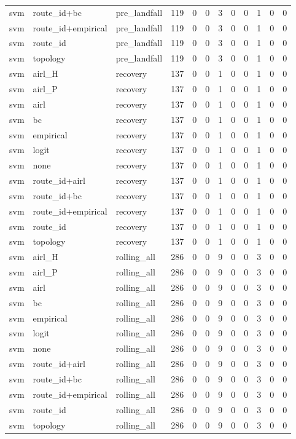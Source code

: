 \begin{tabular}{lllrrrrrrrrr}
svm & route_id+bc & pre_landfall & 119 & 0 & 0 & 3 & 0 & 0 & 1 & 0 & 0 \\
svm & route_id+empirical & pre_landfall & 119 & 0 & 0 & 3 & 0 & 0 & 1 & 0 & 0 \\
svm & route_id & pre_landfall & 119 & 0 & 0 & 3 & 0 & 0 & 1 & 0 & 0 \\
svm & topology & pre_landfall & 119 & 0 & 0 & 3 & 0 & 0 & 1 & 0 & 0 \\
svm & airl_H & recovery & 137 & 0 & 0 & 1 & 0 & 0 & 1 & 0 & 0 \\
svm & airl_P & recovery & 137 & 0 & 0 & 1 & 0 & 0 & 1 & 0 & 0 \\
svm & airl & recovery & 137 & 0 & 0 & 1 & 0 & 0 & 1 & 0 & 0 \\
svm & bc & recovery & 137 & 0 & 0 & 1 & 0 & 0 & 1 & 0 & 0 \\
svm & empirical & recovery & 137 & 0 & 0 & 1 & 0 & 0 & 1 & 0 & 0 \\
svm & logit & recovery & 137 & 0 & 0 & 1 & 0 & 0 & 1 & 0 & 0 \\
svm & none & recovery & 137 & 0 & 0 & 1 & 0 & 0 & 1 & 0 & 0 \\
svm & route_id+airl & recovery & 137 & 0 & 0 & 1 & 0 & 0 & 1 & 0 & 0 \\
svm & route_id+bc & recovery & 137 & 0 & 0 & 1 & 0 & 0 & 1 & 0 & 0 \\
svm & route_id+empirical & recovery & 137 & 0 & 0 & 1 & 0 & 0 & 1 & 0 & 0 \\
svm & route_id & recovery & 137 & 0 & 0 & 1 & 0 & 0 & 1 & 0 & 0 \\
svm & topology & recovery & 137 & 0 & 0 & 1 & 0 & 0 & 1 & 0 & 0 \\
svm & airl_H & rolling_all & 286 & 0 & 0 & 9 & 0 & 0 & 3 & 0 & 0 \\
svm & airl_P & rolling_all & 286 & 0 & 0 & 9 & 0 & 0 & 3 & 0 & 0 \\
svm & airl & rolling_all & 286 & 0 & 0 & 9 & 0 & 0 & 3 & 0 & 0 \\
svm & bc & rolling_all & 286 & 0 & 0 & 9 & 0 & 0 & 3 & 0 & 0 \\
svm & empirical & rolling_all & 286 & 0 & 0 & 9 & 0 & 0 & 3 & 0 & 0 \\
svm & logit & rolling_all & 286 & 0 & 0 & 9 & 0 & 0 & 3 & 0 & 0 \\
svm & none & rolling_all & 286 & 0 & 0 & 9 & 0 & 0 & 3 & 0 & 0 \\
svm & route_id+airl & rolling_all & 286 & 0 & 0 & 9 & 0 & 0 & 3 & 0 & 0 \\
svm & route_id+bc & rolling_all & 286 & 0 & 0 & 9 & 0 & 0 & 3 & 0 & 0 \\
svm & route_id+empirical & rolling_all & 286 & 0 & 0 & 9 & 0 & 0 & 3 & 0 & 0 \\
svm & route_id & rolling_all & 286 & 0 & 0 & 9 & 0 & 0 & 3 & 0 & 0 \\
svm & topology & rolling_all & 286 & 0 & 0 & 9 & 0 & 0 & 3 & 0 & 0 \\
\bottomrule
\end{tabular}
